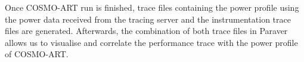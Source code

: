 Once COSMO-ART run is finished, trace files containing the power profile 
using the power data  received from the tracing server and the
instrumentation trace files are generated.
Afterwards, the combination of both trace files in Paraver allows us 
to visualise and correlate the performance trace with the power profile of COSMO-ART.



